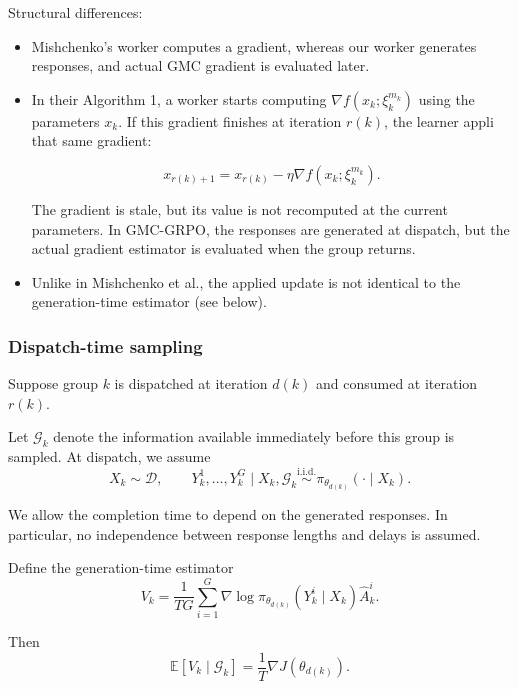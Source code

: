 Structural differences:
\begin{itemize}
    \item  Mishchenko's worker computes a gradient, whereas our worker generates responses, and actual GMC gradient is evaluated later.
    \item In their Algorithm 1, a worker starts computing
    $
    \nabla f\left(x_k ; \xi_k^{m_k}\right)
    $
    using the parameters $x_k$. If this gradient finishes at iteration $r(k)$, the learner appli that same gradient:

    $$
    x_{r(k)+1}=x_{r(k)}-\eta \nabla f\left(x_k ; \xi_k^{m_k}\right) .
    $$

    The gradient is stale, but its value is not recomputed at the current parameters. In GMC-GRPO, the responses are generated at dispatch, but the actual gradient estimator is evaluated when the group returns.
    \item Unlike in Mishchenko et al., the applied update is not identical to the generation-time estimator (see below).
    \end{itemize}


\subsubsection{Dispatch-time sampling}

Suppose group $k$ is dispatched at iteration $d(k)$ and consumed at iteration $r(k)$.

Let $\mathcal G_k$ denote the information available immediately
before this group is sampled. At dispatch, we assume
\begin{equation*}
X_k\sim\mathcal D,
\qquad
Y_k^1,\ldots,Y_k^G
\mid X_k,\mathcal G_k
\overset{\mathrm{i.i.d.}}{\sim}
\pi_{\theta_{d(k)}}(\cdot\mid X_k).
\end{equation*}

We allow the completion time to depend on the generated
responses. In particular, no independence between
response lengths and delays is assumed.

Define the generation-time estimator
\begin{equation*}
V_k=
\frac{1}{TG}\sum_{i=1}^G
\nabla\log\pi_{\theta_{d(k)}}(Y_k^i\mid X_k)
\widehat A_k^i.
\end{equation*}

Then
\begin{equation*}
\mathbb E[V_k\mid\mathcal G_k]
=\frac1T\nabla J(\theta_{d(k)}).
\end{equation*}

